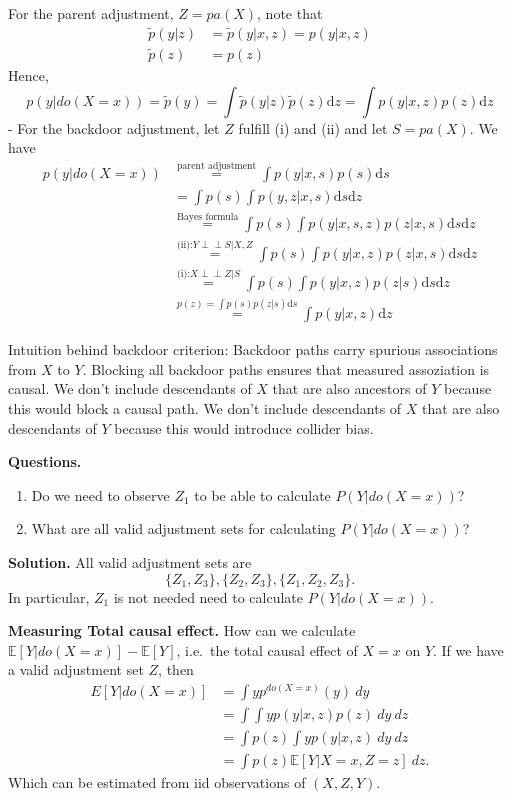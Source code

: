 \documentclass[
]{book}
\providecommand{\tightlist}{%
  \setlength{\itemsep}{0pt}\setlength{\parskip}{0pt}}
\begin{document}
For the parent adjustment, \(Z=pa(X)\), note that\\
\begin{align}
\tilde p (y|z)&= \tilde p (y|x,z)= p (y|x,z) \\
\tilde p(z)&= p(z)
\end{align}
Hence,
\[
p(y|do(X=x))= \tilde p(y)= \int \tilde p(y|z) \tilde p(z) \mathrm dz = \int  p(y|x,z)  p(z) \mathrm dz
\]
- For the backdoor adjustment, let \(Z\) fulfill (i) and (ii) and let \(S=pa(X)\). We have
\begin{align}
p(y|do(X=x))&\stackrel{\text{parent adjustment}}{=} \int  p(y|x,s)  p(s) \mathrm ds\\
&=\int p(s)\int   p(y,z|x,s) \mathrm ds \mathrm dz \\
&\stackrel{\text{Bayes formula}}{=}\int p(s)\int   p(y|x,s,z) p(z|x,s) \mathrm ds \mathrm dz \\
&\stackrel{\text{(ii):} Y {\perp\!\!\!\!\perp } {S}| {X,Z}}{=}\int p(s)\int   p(y|x,z) p(z|x,s) \mathrm ds \mathrm dz \\
&\stackrel{\text{(i):} X {\perp\!\!\!\!\perp } {Z}| {S}}{=}\int p(s)\int   p(y|x,z) p(z|s) \mathrm ds \mathrm dz \\
&\stackrel{p(z)= \int p(s)p(z|s) \mathrm ds}{=}\int   p(y|x,z)   \mathrm dz 
\end{align}

Intuition behind backdoor criterion: Backdoor paths carry spurious associations from \(X\) to \(Y\). Blocking all backdoor paths ensures that measured assoziation is causal. We don't include descendants of \(𝑋\) that are also ancestors of \(𝑌\) because this would block a causal path. We don't include descendants of \(𝑋\) that are also descendants of \(𝑌\) because this would introduce collider bias.

\textbf{Questions.}

\begin{enumerate}
\def\labelenumi{\alph{enumi}.}
\tightlist
\item
  Do we need to observe \(Z_1\) to be able to calculate \(P(Y|do(X=x))\)?
\item
  What are all valid adjustment sets for calculating \(P(Y|do(X=x))\)?
\end{enumerate}

\textbf{Solution.} All valid adjustment sets are
\[
\{Z_1,Z_3\},\{Z_2,Z_3\},\{Z_1,Z_2,Z_3\}.
\]
In particular, \(Z_1\) is not needed need to calculate \(P(Y\vert do(X=x))\).

\textbf{Measuring Total causal effect.} How can we calculate \(\mathbb E[Y\vert do(X =x)]-\mathbb E[Y]\), i.e.~the total causal effect of \(X=x\) on \(Y\). If we have a valid adjustment set \(Z\), then
\begin{align}
E[Y\vert do(X =x)]&= \int y p^{d o(X=x)}(y) \ dy \\
&= \int \int  y p(y\vert x,z)p(z) \ dy \ dz \\
&= \int p(z)   \int y p(y\vert x,z)\ dy \ dz \\
&= \int p(z)  \mathbb E[  Y\vert X=x,Z=z]\ dz .
\end{align}
Which can be estimated from iid observations of \((X,Z,Y)\).
\end{document}
